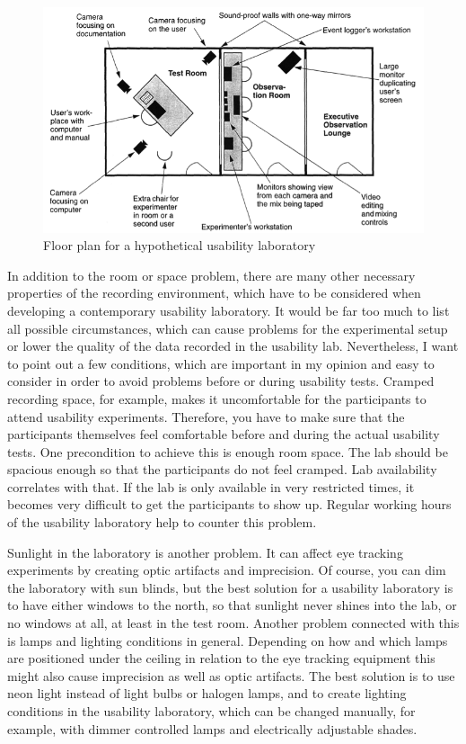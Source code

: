 \documentclass[output=paper]{langsci/langscibook}
\begin{document}
\begin{figure}
 \includegraphics[width=\textwidth]{figures/Roesener6.png}
 \caption{Floor plan for a hypothetical usability laboratory \citep[201]{nielsen1993}}
 \label{roesener:fig:6}
\end{figure} 


In addition to the room or space problem, there are many other necessary properties of the recording environment, which have to be considered when developing a contemporary usability laboratory. It would be far too much to list all possible circumstances, which can cause problems for the experimental setup or lower the quality of the data recorded in the usability lab. Nevertheless, I want to point out a few conditions, which are important in my opinion and easy to consider in order to avoid problems before or during usability tests. Cramped recording space, for example, makes it uncomfortable for the participants to attend usability experiments. Therefore, you have to make sure that the participants themselves feel comfortable before and during the actual usability tests. One precondition to achieve this is enough room space. The lab should be spacious enough so that the participants do not feel cramped. Lab availability correlates with that. If the lab is only available in very restricted times, it becomes very difficult to get the participants to show up. Regular working hours of the usability laboratory help to counter this problem.


 Sunlight in the laboratory is another problem. It can affect eye tracking experiments by creating optic artifacts and imprecision. Of course, you can dim the laboratory with sun blinds, but the best solution for a usability laboratory is to have either windows to the north, so that sunlight never shines into the lab, or no windows at all, at least in the test room. Another problem connected with this is lamps and lighting conditions in general. Depending on how and which lamps are positioned under the ceiling in relation to the eye tracking equipment this might also cause imprecision as well as optic artifacts. The best solution is to use neon light instead of light bulbs or halogen lamps, and to create lighting conditions in the usability laboratory, which can be changed manually, for example, with dimmer controlled lamps and electrically adjustable shades.
\end{document}
